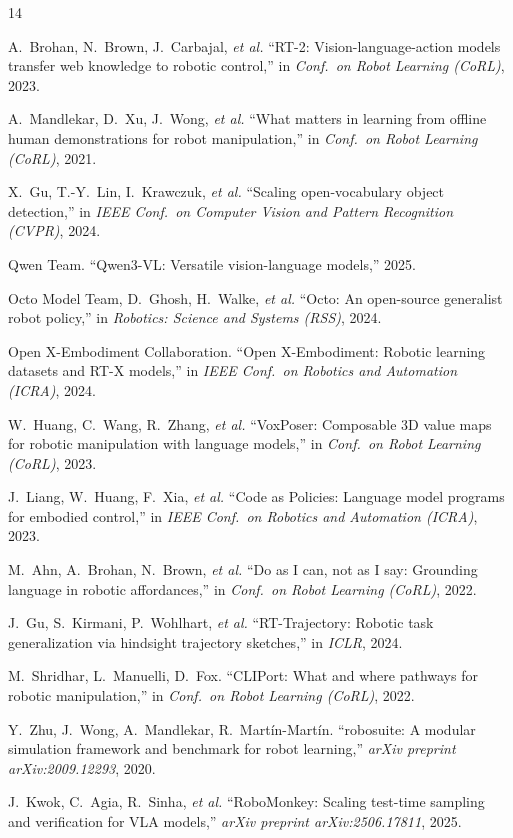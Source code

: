 \documentclass[conference]{IEEEtran}
\begin{document}
\begin{thebibliography}{14}

 A.~Brohan, N.~Brown, J.~Carbajal, \emph{et al.}
``RT-2: Vision-language-action models transfer web knowledge to robotic control,''
in \emph{Conf.\ on Robot Learning (CoRL)}, 2023.

 A.~Mandlekar, D.~Xu, J.~Wong, \emph{et al.}
``What matters in learning from offline human demonstrations for robot manipulation,''
in \emph{Conf.\ on Robot Learning (CoRL)}, 2021.

 X.~Gu, T.-Y.~Lin, I.~Krawczuk, \emph{et al.}
``Scaling open-vocabulary object detection,''
in \emph{IEEE Conf.\ on Computer Vision and Pattern Recognition (CVPR)}, 2024.

 Qwen Team.
``Qwen3-VL: Versatile vision-language models,'' 2025.

 Octo Model Team, D.~Ghosh, H.~Walke, \emph{et al.}
``Octo: An open-source generalist robot policy,''
in \emph{Robotics: Science and Systems (RSS)}, 2024.

 Open X-Embodiment Collaboration.
``Open X-Embodiment: Robotic learning datasets and RT-X models,''
in \emph{IEEE Conf.\ on Robotics and Automation (ICRA)}, 2024.

 W.~Huang, C.~Wang, R.~Zhang, \emph{et al.}
``VoxPoser: Composable 3D value maps for robotic manipulation with language models,''
in \emph{Conf.\ on Robot Learning (CoRL)}, 2023.

 J.~Liang, W.~Huang, F.~Xia, \emph{et al.}
``Code as Policies: Language model programs for embodied control,''
in \emph{IEEE Conf.\ on Robotics and Automation (ICRA)}, 2023.

 M.~Ahn, A.~Brohan, N.~Brown, \emph{et al.}
``Do as I can, not as I say: Grounding language in robotic affordances,''
in \emph{Conf.\ on Robot Learning (CoRL)}, 2022.

 J.~Gu, S.~Kirmani, P.~Wohlhart, \emph{et al.}
``RT-Trajectory: Robotic task generalization via hindsight trajectory sketches,''
in \emph{ICLR}, 2024.

 M.~Shridhar, L.~Manuelli, D.~Fox.
``CLIPort: What and where pathways for robotic manipulation,''
in \emph{Conf.\ on Robot Learning (CoRL)}, 2022.

 Y.~Zhu, J.~Wong, A.~Mandlekar, R.~Mart\'in-Mart\'in.
``robosuite: A modular simulation framework and benchmark for robot learning,''
\emph{arXiv preprint arXiv:2009.12293}, 2020.

 J.~Kwok, C.~Agia, R.~Sinha, \emph{et al.}
``RoboMonkey: Scaling test-time sampling and verification for VLA models,''
\emph{arXiv preprint arXiv:2506.17811}, 2025.


\end{thebibliography}
\end{document}
